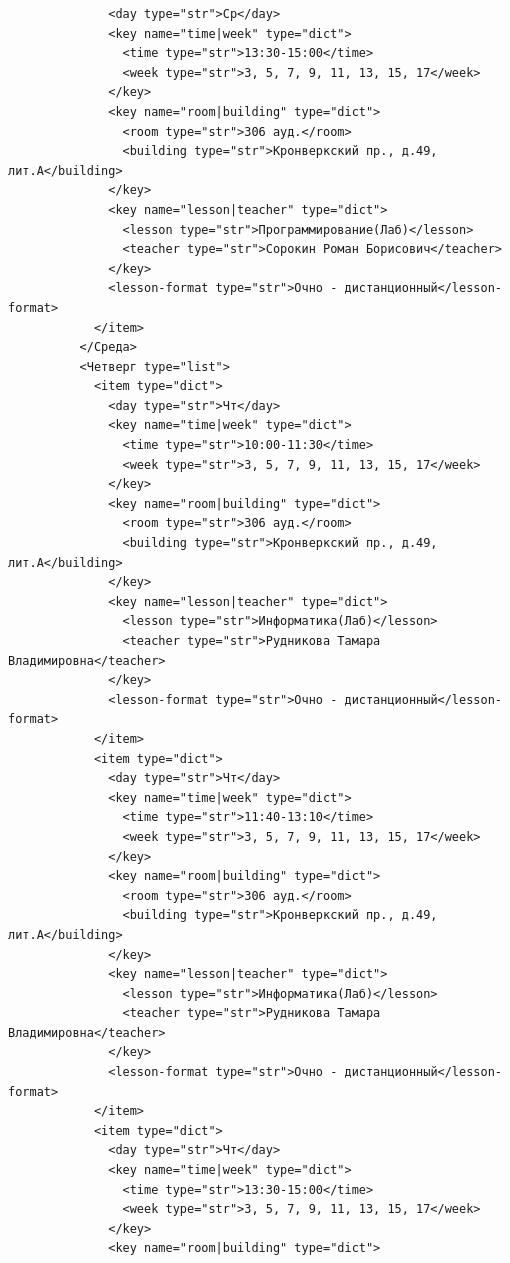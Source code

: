 \documentclass[12pt,onecolumn]{article}
\begin{document}
\begin{flushleft}
\begin{verbatim}
              <day type="str">Ср</day>
              <key name="time|week" type="dict">
                <time type="str">13:30-15:00</time>
                <week type="str">3, 5, 7, 9, 11, 13, 15, 17</week>
              </key>
              <key name="room|building" type="dict">
                <room type="str">306 ауд.</room>
                <building type="str">Кронверкский пр., д.49, лит.А</building>
              </key>
              <key name="lesson|teacher" type="dict">
                <lesson type="str">Программирование(Лаб)</lesson>
                <teacher type="str">Сорокин Роман Борисович</teacher>
              </key>
              <lesson-format type="str">Очно - дистанционный</lesson-format>
            </item>
          </Среда>
          <Четверг type="list">
            <item type="dict">
              <day type="str">Чт</day>
              <key name="time|week" type="dict">
                <time type="str">10:00-11:30</time>
                <week type="str">3, 5, 7, 9, 11, 13, 15, 17</week>
              </key>
              <key name="room|building" type="dict">
                <room type="str">306 ауд.</room>
                <building type="str">Кронверкский пр., д.49, лит.А</building>
              </key>
              <key name="lesson|teacher" type="dict">
                <lesson type="str">Информатика(Лаб)</lesson>
                <teacher type="str">Рудникова Тамара Владимировна</teacher>
              </key>
              <lesson-format type="str">Очно - дистанционный</lesson-format>
            </item>
            <item type="dict">
              <day type="str">Чт</day>
              <key name="time|week" type="dict">
                <time type="str">11:40-13:10</time>
                <week type="str">3, 5, 7, 9, 11, 13, 15, 17</week>
              </key>
              <key name="room|building" type="dict">
                <room type="str">306 ауд.</room>
                <building type="str">Кронверкский пр., д.49, лит.А</building>
              </key>
              <key name="lesson|teacher" type="dict">
                <lesson type="str">Информатика(Лаб)</lesson>
                <teacher type="str">Рудникова Тамара Владимировна</teacher>
              </key>
              <lesson-format type="str">Очно - дистанционный</lesson-format>
            </item>
            <item type="dict">
              <day type="str">Чт</day>
              <key name="time|week" type="dict">
                <time type="str">13:30-15:00</time>
                <week type="str">3, 5, 7, 9, 11, 13, 15, 17</week>
              </key>
              <key name="room|building" type="dict">

\end{verbatim}
\end{flushleft}
\end{document}
